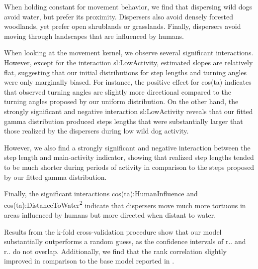 \documentclass[abstract=on,10pt,a4paper,bibliography=totocnumbered]{article}
\begin{document}
When holding constant for movement behavior, we find that dispersing wild dogs
avoid water, but prefer its proximity. Dispersers also avoid densely forested
woodlands, yet prefer open shrublands or grasslands. Finally, dispersers avoid
moving through landscapes that are influenced by humans.

When looking at the movement kernel, we observe several significant
interactions. However, except for the interaction \textsf{sl:LowActivity},
estimated slopes are relatively flat, suggesting that our initial distributions
for step lengths and turning angles were only marginally biased. For instance,
the positive effect for \textsf{cos(ta)} indicates that observed turning angles
are slightly more directional compared to the turning angles proposed by our
uniform distribution. On the other hand, the strongly significant and negative
interaction \textsf{sl:LowActivity} reveals that our fitted gamma distribution
produced steps lengths that were substantially larger that those realized by the
dispersers during low wild dog activity.

However, we also find a strongly significant and negative interaction between
the step length and main-activity indicator, showing that realized step lengths
tended to be much shorter during periods of activity in comparison to the steps
proposed by our fitted gamma distribution.

Finally, the significant interactions \textsf{cos(ta):HumanInfluence} and
\textsf{cos(ta):DistanceToWater\textsuperscript{2}} indicate that dispersers
move much more tortuous in areas influenced by humans but more directed when
distant to water.

Results from the k-fold cross-validation procedure show that our model
substantially outperforms a random guess, as the confidence intervals of r.. and
r.. do not overlap. Additionally, we find that the rank correlation slightly
improved in comparison to the base model reported in \citep{Hofmann.2021}.
\end{document}
